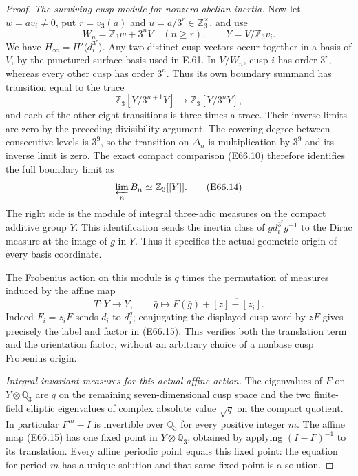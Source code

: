 \begin{proof}
\emph{The surviving cusp module for nonzero abelian inertia.}
Now let $w=a v_i\ne0$, put $r=v_3(a)$ and
$u=a/3^r\in\mathbb Z_3^\times$, and use
\[
 W_n=\mathbb Z_3w+3^nV\quad(n\ge r),\qquad
 Y=V/\mathbb Z_3v_i .
 \tag{E66.12}
\]
We have $H_\infty=\Pi'\langle d_i^{3^r}\rangle$.
Any two distinct cusp vectors occur together in a basis of
$V$, by the punctured-surface basis used in E.61.
In $V/W_n$, cusp $i$ has order $3^r$, whereas every other
cusp has order $3^n$. Thus its own boundary summand has
transition equal to the trace
\[
 \mathbb Z_3[Y/3^{n+1}Y]\longrightarrow
                         \mathbb Z_3[Y/3^nY],
 \tag{E66.13}
\]
and each of the other eight transitions is three times a trace.
Their inverse limits are zero by the preceding divisibility
argument. The covering degree between consecutive levels is
$3^9$, so the transition on $\Delta_n$ is multiplication
by $3^9$ and its inverse limit is zero. The exact compact
comparison (E66.10) therefore identifies the full boundary limit
as
\[
             \varprojlim_nB_n
                  \simeq\mathbb Z_3[[Y]] .
 \tag{E66.14}
\]
The right side is the module of integral three-adic measures
on the compact additive group $Y$. This identification sends
the inertia class of $g d_i^{3^r}g^{-1}$ to the Dirac measure
at the image of $g$ in $Y$. Thus it specifies the actual
geometric origin of every basis coordinate.

The Frobenius action on this module is $q$ times the
permutation of measures induced by the affine map
\[
       T:Y\longrightarrow Y,
       \qquad \bar g\longmapsto
          F(\bar g)+\overline{[z]-[z_i]} .
 \tag{E66.15}
\]
Indeed $F_i=z_iF$ sends $d_i$ to $d_i^q$; conjugating the
displayed cusp word by $zF$ gives precisely the label and
factor in (E66.15). This verifies both the translation term
and the orientation factor, without an arbitrary choice of
a nonbase cusp Frobenius origin.

\emph{Integral invariant measures for this actual affine action.}
The eigenvalues of $F$ on $Y\otimes\mathbb Q_3$ are $q$ on
the remaining seven-dimensional cusp space and the two
finite-field elliptic eigenvalues of complex absolute value
$\sqrt q$ on the compact quotient. In particular $F^m-I$
is invertible over $\mathbb Q_3$ for every positive integer $m$.
The affine map (E66.15) has one fixed point in
$Y\otimes\mathbb Q_3$, obtained by applying $(I-F)^{-1}$
to its translation. Every affine periodic point equals
this fixed point: the equation for period $m$ has a unique
solution and that same fixed point is a solution.


\end{proof}
